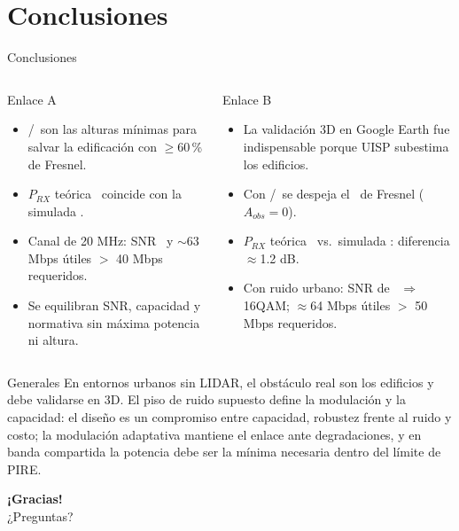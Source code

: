 \renewcommand{\seccorta}{Conclusiones}
\section{Conclusiones}

\begin{frame}{Conclusiones}
  \begin{columns}[T]
    \begin{block}{Enlace A}
      \small
      \begin{itemize}
        \item \EAunoAlt/\EAdosAlt\ son las alturas mínimas para salvar la edificación
              con $\geq$60\,\% de Fresnel.
        \item $P_{RX}$ teórica \EAprxTeo\ coincide con la simulada \EAprxSim.
        \item Canal de 20 MHz: SNR \EAsnr\ y $\sim$63 Mbps útiles $>$ 40 Mbps requeridos.
        \item Se equilibran SNR, capacidad y normativa sin máxima potencia ni altura.
      \end{itemize}
    \end{block}
    \begin{block}{Enlace B}
      \small
      \begin{itemize}
        \item La validación 3D en Google Earth fue indispensable porque UISP subestima los edificios.
        \item Con \EBunoAlt/\EBdosAlt\ se despeja el \EBdespejePct\ de Fresnel ($A_{obs}=0$).
        \item $P_{RX}$ teórica \EBprxTeo\ vs.\ simulada \EBprxSim: diferencia $\approx$1.2 dB.
        \item Con ruido urbano: SNR de \EBsnr\ $\Rightarrow$ 16QAM; $\approx$64 Mbps útiles $>$ 50 Mbps requeridos.
      \end{itemize}
    \end{block}
  \end{columns}
  \vspace{4pt}
  \begin{alertblock}{Generales}
    \small En entornos urbanos sin LIDAR, el obstáculo real son los edificios y debe validarse en 3D.
    El piso de ruido supuesto define la modulación y la capacidad: el diseño es un compromiso entre capacidad, robustez frente al ruido y costo; la modulación
    adaptativa mantiene el enlace ante degradaciones, y en banda compartida la potencia debe
    ser la mínima necesaria dentro del límite de PIRE.
  \end{alertblock}
\end{frame}

\begin{frame}[plain]
  \centering\vfill
  {\Huge\bfseries ¡Gracias!}\\[8pt]
  {\color{naranja}\large ¿Preguntas?}
  \vfill
\end{frame}

